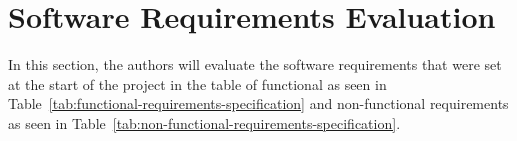 \section{Software Requirements Evaluation}\label{sec:software-requirements-evaluation}

In this section, the authors will evaluate the software requirements that were set at the start of the project in the
table of functional as seen in Table~\ref{tab:functional-requirements-specification}
and non-functional requirements as seen in Table~\ref{tab:non-functional-requirements-specification}.



